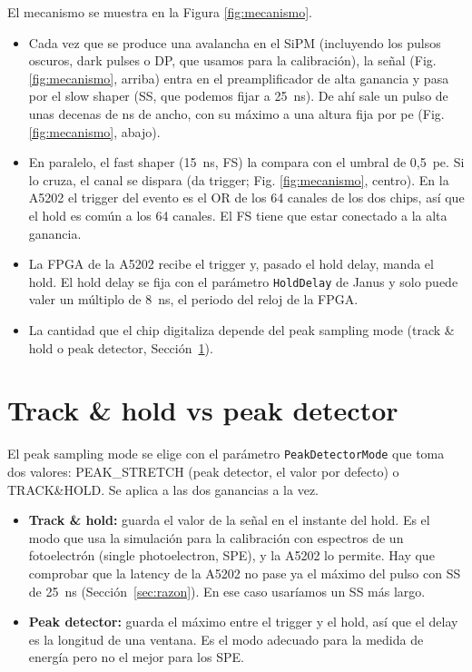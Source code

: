 \documentclass[11pt,a4paper]{article}
\begin{document}
El mecanismo se muestra en la Figura \ref{fig:mecanismo}. 

\begin{itemize}
\item Cada vez que se produce una avalancha en el SiPM (incluyendo los
  pulsos oscuros, dark pulses o DP, que usamos para la calibración), la señal (Fig. \ref{fig:mecanismo}, arriba)
  entra en el preamplificador de alta ganancia y pasa por el slow shaper (SS, que podemos
  fijar a 25~ns). De ahí sale un pulso de unas decenas de ns de ancho, con su
  máximo a una altura fija por pe (Fig. \ref{fig:mecanismo}, abajo).
\item En paralelo, el fast shaper (15~ns, FS) la compara con el umbral
  de 0,5~pe. Si lo cruza, el canal se dispara (da trigger; Fig. \ref{fig:mecanismo}, centro). En la A5202 el trigger del
  evento es el OR de los 64 canales de los dos chips, así que el hold es
  común a los 64 canales. El FS tiene que estar conectado a la alta
  ganancia.
\item La FPGA de la A5202 recibe el trigger y, pasado el hold delay, manda
  el hold. El hold delay se fija con el parámetro \texttt{HoldDelay} de Janus y solo
  puede valer un múltiplo de 8~ns, el periodo del reloj de la FPGA.
\item La cantidad que el chip digitaliza depende del peak sampling mode
  (track \& hold o peak detector, Sección~\ref{sec:modos}).
\end{itemize}

\section{Track \& hold vs peak detector}
\label{sec:modos}

El peak sampling mode se elige con el parámetro \texttt{PeakDetectorMode} que toma dos valores:
PEAK\_STRETCH (peak detector, el valor por defecto) o TRACK\&HOLD. Se
aplica a las dos ganancias a la vez.

\begin{itemize}
\item {\bf Track \& hold:} guarda el valor de la señal en el instante del
  hold. Es el modo que usa la simulación para la calibración con espectros
  de un fotoelectrón (single photoelectron, SPE), y la
  A5202 lo permite. Hay que comprobar que la latency de la A5202 no pase ya
  el máximo del pulso con SS de 25~ns (Sección~\ref{sec:razon}). En ese caso usaríamos un SS más largo. 
\item {\bf Peak detector:} guarda el máximo entre el trigger y el hold, así
  que el delay es la longitud de una ventana. Es el modo adecuado para la
  medida de energía pero no el mejor para los SPE.
\end{itemize}
\end{document}
